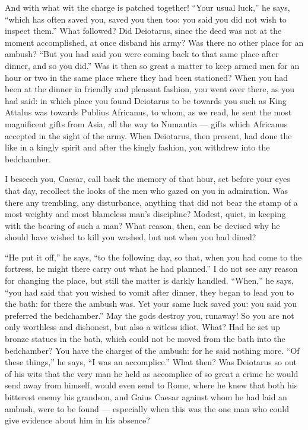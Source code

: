  And with what wit the charge is patched together! ``Your usual luck,'' he says, ``which has often saved you, saved you then too: you said you did not wish to inspect them.'' What followed? Did Deiotarus, since the deed was not at the moment accomplished, at once disband his army? Was there no other place for an ambush? ``But you had said you were coming back to that same place after dinner, and so you did.'' Was it then so great a matter to keep armed men for an hour or two in the same place where they had been stationed? When you had been at the dinner in friendly and pleasant fashion, you went over there, as you had said: in which place you found Deiotarus to be towards you such as King Attalus was towards Publius Africanus, to whom, as we read, he sent the most magnificent gifts from Asia, all the way to Numantia --- gifts which Africanus accepted in the sight of the army. When Deiotarus, then present, had done the like in a kingly spirit and after the kingly fashion, you withdrew into the bedchamber.

 I beseech you, Caesar, call back the memory of that hour, set before your eyes that day, recollect the looks of the men who gazed on you in admiration. Was there any trembling, any disturbance, anything that did not bear the stamp of a most weighty and most blameless man's discipline? Modest, quiet, in keeping with the bearing of such a man? What reason, then, can be devised why he should have wished to kill you washed, but not when you had dined?

 ``He put it off,'' he says, ``to the following day, so that, when you had come to the fortress, he might there carry out what he had planned.'' I do not see any reason for changing the place, but still the matter is darkly handled. ``When,'' he says, ``you had said that you wished to vomit after dinner, they began to lead you to the bath: for there the ambush was. Yet your same luck saved you: you said you preferred the bedchamber.'' May the gods destroy you, runaway! So you are not only worthless and dishonest, but also a witless idiot. What? Had he set up bronze statues in the bath, which could not be moved from the bath into the bedchamber? You have the charges of the ambush: for he said nothing more. ``Of these things,'' he says, ``I was an accomplice.'' What then? Was Deiotarus so out of his wits that the very man he held as accomplice of so great a crime he would send away from himself, would even send to Rome, where he knew that both his bitterest enemy his grandson, and Gaius Caesar against whom he had laid an ambush, were to be found --- especially when this was the one man who could give evidence about him in his absence?

